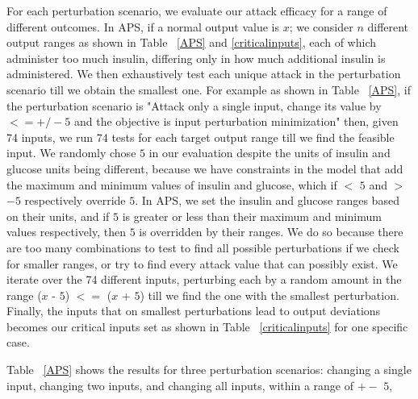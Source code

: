For each perturbation scenario, we evaluate our attack efficacy for a range of different outcomes. 
 In \ac{APS}, if a normal output value is $x$; we consider $n$ different output ranges as shown in Table ~\ref{APS} and \ref{criticalinputs}, each of which administer too much insulin, differing only in how much additional insulin is administered.	
 We then exhaustively test each unique attack in the perturbation scenario till we obtain the smallest one.
 For example as shown in Table ~\ref{APS}, if the perturbation scenario is "Attack only a single input, change its value by $<= +/- 5$ and the objective is input perturbation minimization" then, given 74 inputs, we run 74 tests for each target output range till we find the feasible input. 
 We randomly chose $5$ in our evaluation despite the units of insulin and glucose units being different,  because we have constraints in the model that add the maximum and minimum values of insulin and glucose, which if $<$ $5$ and $>$ $-5$  respectively override $5$. 
 In \ac{APS}, we set the insulin and glucose ranges based on their units, and if $5$ is greater or less than their maximum and minimum values respectively, then $5$ is overridden by their ranges. 
 We do so because there are too many combinations to test to find all possible perturbations if we check for smaller ranges, or try to find every attack value that can possibly exist.   
 We iterate over the 74 different inputs, perturbing each by a random amount in the range ($x$ - $5$) $<=$ ($x$ + $5$) till we find the one with the smallest perturbation. 
 Finally, the inputs that on smallest perturbations lead to output deviations  becomes our critical inputs set as shown in Table ~\ref{criticalinputs} for one specific case. 
 
 Table ~\ref{APS} shows the results for three perturbation scenarios: changing a single input, changing two inputs, and changing all inputs, within a range of $+-$ $5$, %
 
